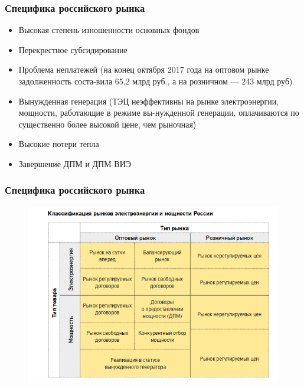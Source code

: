 \documentclass[c, dvipsnames]{beamer}  %
\begin{document}
\begin{frame}[shrink=5]
\frametitle{Специфика российского рынка} 


\begin{itemize}
	\item  Высокая степень изношенности основных фондов
	\item  Перекрестное субсидирование
	\item  Проблема неплатежей (на конец октября 2017 года на оптовом рынке задолженность соста-вила 65,2 млрд руб., а на розничном — 243 млрд руб)
	\item  Вынужденная генерация  (ТЭЦ  неэффективны на рынке электроэнергии, мощности, работающие в режиме вы-нужденной генерации, оплачиваются по существенно более высокой цене, чем рыночная)
	\item  Высокие потери тепла
	\item   Завершение ДПМ и ДПМ ВИЭ
\end{itemize}



\end{frame}




\begin{frame}[shrink=5]


\frametitle{Специфика российского рынка} 



\begin{figure}
	\centering
	\includegraphics[width=0.7\linewidth]{screenshot004}
	\caption{}
	\label{fig:screenshot004}
\end{figure}


\end{frame}
\end{document}

